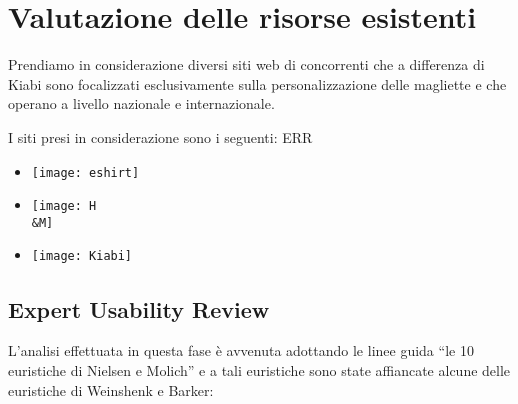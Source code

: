 \documentclass[12pt,italian,]{report}
\providecommand{\tightlist}{%
  \setlength{\itemsep}{0pt}\setlength{\parskip}{0pt}}
\begin{document}
\hypertarget{valutazione-delle-risorse-esistenti}{%
\chapter{Valutazione delle risorse
esistenti}\label{valutazione-delle-risorse-esistenti}}

Prendiamo in considerazione diversi siti web di concorrenti che a
differenza di Kiabi sono focalizzati esclusivamente sulla
personalizzazione delle magliette e che operano a livello nazionale e
internazionale.

I siti presi in considerazione sono i seguenti: ERR

\begin{itemize}
\tightlist
\item
  \texttt{[image: eshirt]}
\item
  \texttt{[image: H\\\&M]}
\item
  \texttt{[image: Kiabi]}
\end{itemize}

\hypertarget{expert-usability-review}{%
\section{Expert Usability Review}\label{expert-usability-review}}

L'analisi effettuata in questa fase è avvenuta adottando le linee guida
``le 10 euristiche di Nielsen e Molich'' e a tali euristiche sono state
affiancate alcune delle euristiche di Weinshenk e Barker:
\end{document}
